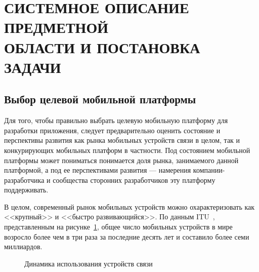 \section[Системное описание предметной области и постановка задачи]{%
  СИСТЕМНОЕ ОПИСАНИЕ ПРЕДМЕТНОЙ \\
  ОБЛАСТИ И ПОСТАНОВКА ЗАДАЧИ
}\label{sec:system_spec}

\subsection{Выбор целевой мобильной платформы}

Для того, чтобы правильно выбрать целевую мобильную платформу
для разработки приложения, следует предварительно оценить состояние
и перспективы развития как рынка мобильных устройств связи в целом,
так и конкурирующих мобильных платформ в частности.
Под состоянием мобильной платформы может пониматься понимается
доля рынка, занимаемого данной платформой,
а под ее перспективами развития --- намерения компании-разработчика и
сообщества сторонних разработчиков эту платформу поддерживать.

В целом, современный рынок мобильных устройств можно охарактеризовать
как <<крупный>> и <<быстро развивающийся>>.
По данным ITU~\cite{itu_stat_phone}, представленным на
рисунке~\ref{fig:system_spec_stat_phones},
общее число мобильных устройств в мире возросло
более чем в три раза за последние десять лет
и составило более семи миллиардов.

\begin{figure}[h!]
  \centering
  \caption{Динамика использования устройств связи}
  \label{fig:system_spec_stat_phones}
\end{figure}

